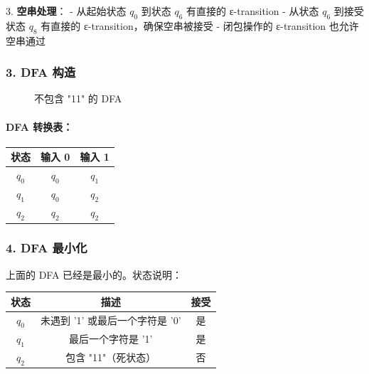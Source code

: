 \documentclass{article}
\begin{document}
3. \textbf{空串处理}：
   - 从起始状态 $q_0$ 到状态 $q_6$ 有直接的 ε-transition
   - 从状态 $q_6$ 到接受状态 $q_8$ 有直接的 ε-transition，确保空串被接受
   - 闭包操作的 ε-transition 也允许空串通过

\subsubsection{3. DFA 构造}

\begin{figure}[h]
    \centering
    \caption{不包含 "11" 的 DFA}
    \label{fig:dfa}
\end{figure}

\paragraph{DFA 转换表：}

\begin{center}
\begin{tabular}{|c|c|c|}
\hline
状态 & 输入 0 & 输入 1 \\
\hline
$q_0$ & $q_0$ & $q_1$ \\
$q_1$ & $q_0$ & $q_2$ \\
$q_2$ & $q_2$ & $q_2$ \\
\hline
\end{tabular}
\end{center}

\subsubsection{4. DFA 最小化}

上面的 DFA 已经是最小的。状态说明：

\begin{center}
\begin{tabular}{|c|c|c|}
\hline
状态 & 描述 & 接受 \\ 
\hline
$q_0$ & 未遇到 '1' 或最后一个字符是 '0' & 是 \\ 
$q_1$ & 最后一个字符是 '1' & 是 \\ 
$q_2$ & 包含 "11"（死状态） & 否 \\ 
\hline
\end{tabular}
\end{center}
\end{document}
